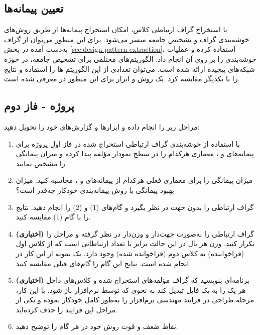 \documentclass[a4paper,12pt]{article}
\begin{document}
\subsection{تعیین پیمانه‌ها}
با استخراج گراف ارتباطی کلاس، امکان استخراج پیمانه‌ها از طریق روش‌های خوشه‌بندی گراف و تشخیص جامعه میسر می‌شود. برای این منظور می‌توان از گراف به‌دست آمده در بخش  \ref{sec:design-pattern-extraction}، استفاده کرده و عملیات خوشه‌بندی را بر روی‌ آن انجام داد. الگوریتم‌های مختلفی برای تشخیص جامعه، در حوزه شبکه‌های پیچیده ارائه شده است. می‌توان تعدادی از این الگوریتم ها را استفاده و نتایج را با یکدیگر مقایسه کرد. یک روش و ابزار برای این منظور در 
\cite{Mancoridis2006, Mancoridis1999}
معرفی شده است.



\subsection{پروژه - فاز دوم}
مراحل زیر را انجام داده و ابزارها و گزارش‌های خود را تحویل دهید:

\begin{enumerate}
	\item{
		با استفاده از خوشه‌بندی گراف ارتباطی استخراج شده در فاز اول پروژه برای پیمانه‌های    و ، معماری هرکدام را در سطح نمودار مؤلفه پیدا کرده و میزان پیمانگی را مشخص نمایید.
	}

\item{
	میزان پیمانگی را برای معماری فعلی هرکدام از پیمانه‌های   و ، محاسبه کنید. میزان بهبود پیمانگی با روش پیمانه‌بندی خودکار چه‌قدر است؟ 
}

\item{
	گراف ارتباطی را بدون جهت در نظر بگیرد و گام‌های (1) و (2) را انجام دهید. نتایج را با گام (1) مقایسه کنید.
}

\item{
	\textbf{(اختیاری) }
	گراف ارتباطی را به‌صورت جهت‌دار و وزن‌دار در نظر گرفته و مراحل را تکرار کنید. وزن هر یال در این حالت برابر با تعداد ارتباطاتی است که از کلاس اول (فراخواننده) به کلاس دوم (فراخوانده شده) وجود دارد. یک نمونه از این کار در 
		\cite{Mancoridis2006}
	انجام شده است. نتایج این گام را گام‌های قبلی مقایسه کنید. 
}


\item{
	\textbf{(اختیاری) }
	برنامه‌ای بنویسید که گراف مؤلفه‌های استخراج شده و کلاس‌های داخل هر یک را به یک فایل  تبدیل کند به نحوی که توسط نرم‌افزار  
	 \cite{EA2020}
	باز شود. با این کار، مرحله طراحی در فرایند مهندسی نرم‌افزار را به‌طور کامل خودکار نموده‌ و یکی از مراحل این فرایند را حذف کرده‌اید.
}

\item{
	نقاط ضعف و قوت روش خود در هر گام را توضیح دهید.
}

\end{enumerate}
\end{document}
